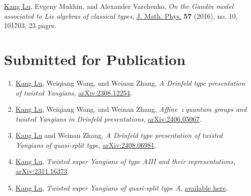 \documentclass[11pt,letterpaper,roman,colorlinks,urlcolor=blue,linkcolor=blue
]{moderncv}
\begin{document}
\begin{etaremune}[leftmargin=1.17cm]
\item \underline{Kang Lu}, Evgeny Mukhin, and Alexander Varchenko, {\textit{On the Gaudin model associated to Lie algebras of classical types}}, \href{https://doi.org/10.1063/1.4964389}{J. Math. Phys.} {\textbf{57}} (2016), no. 10, 101703, 23 pages.
\end{etaremune}
        
\section{Submitted for Publication}

\begin{enumerate}[leftmargin=1.37cm]


\item \underline{Kang Lu}, Weiqiang Wang, and Weinan Zhang, {\textit{A Drinfeld type presentation of twisted Yangians}}, \href{https://arxiv.org/abs/2308.12254}{arXiv:2308.12254}. 

\item \underline{Kang Lu}, Weiqiang Wang, and Weinan Zhang, {\textit{Affine 
$\imath$quantum groups and twisted Yangians in Drinfeld presentations}}, \href{https://arxiv.org/abs/2406.05067}{arXiv:2406.05067}.

\item \underline{Kang Lu} and Weinan Zhang, {\textit{A Drinfeld type presentation of twisted Yangians of quasi-split type}}, \href{https://arxiv.org/abs/2408.06981}{arXiv:2408.06981}.

\item \underline{Kang Lu}, {\textit{Twisted super Yangians of type AIII and their representations}}, \href{https://arxiv.org/abs/2311.16373}{arXiv:2311.16373}.


\item \underline{Kang Lu}, {\textit{Twisted super Yangians of quasi-split type A}}, \href{https://kanglu.me/writings/Twisted_super_Yangians_of_quasi-split_type_A.pdf}{available here}.




\end{enumerate}
\end{document}

